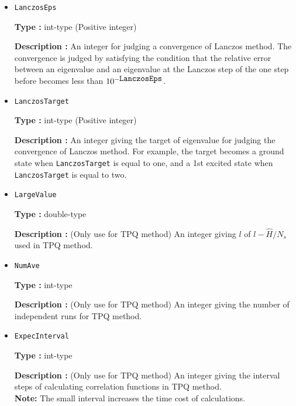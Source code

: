 \begin{itemize}
{\bf Description :} 
 An integer for setting the number of getting eigenvectors from the ground energy by Lanczos method.\\
{\bf Note}:  the following condition must be satisfied \verb|nvec| $>=$ \verb|exct|.

\item   \verb|LanczosEps|
   
{\bf Type :} int-type (Positive integer)

{\bf Description :} An integer for judging a convergence of Lanczos method. The convergence is judged by satisfying the condition that the relative error between an eigenvalue and an eigenvalue at the Lanczos step of the one step before becomes less than $10^{- \verb|LanczosEps|}$.

 \item  \verb|LanczosTarget| 
   
 {\bf Type :} int-type (Positive integer)

  {\bf Description :} An integer giving the target of eigenvalue for judging the convergence of Lanczos method. For example, the target becomes a ground state when \verb|LanczosTarget|  is equal to one, and a 1st excited state when  \verb|LanczosTarget|  is equal to two.
     
\item \verb|LargeValue|

{\bf Type :} double-type

{\bf Description :} (Only use for TPQ method) An integer giving $l$ of $l-\hat{H}/N_{s}$ used in TPQ method.
 
\item \verb|NumAve|

{\bf Type :} int-type

{\bf Description :} (Only use for TPQ method) An integer giving the number of independent runs for TPQ method. 

\item \verb|ExpecInterval|

{\bf Type :} int-type

{\bf Description :} (Only use for TPQ method) An integer giving the interval steps of calculating correlation functions in TPQ method.\\ 
{\bf Note:} The small interval increases the time cost of calculations.
 
 \end{itemize}


\newpage
